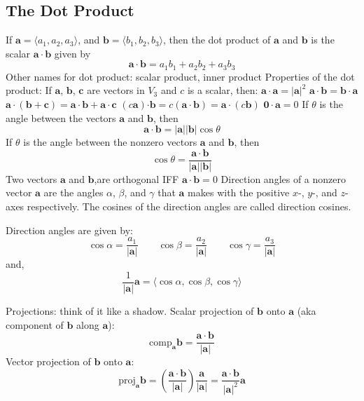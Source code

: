 \documentclass{article}
\begin{document}
    \subsection{The Dot Product}
    \begin{outline}
        \1 If \(\mathbf a=\langle a_1,a_2,a_3\rangle\), and \(\mathbf b=\langle b_1,b_2,b_3\rangle\), then the dot product of \(\mathbf a\) and \(\mathbf b\) is the scalar \(\mathbf{a\cdot b}\) given by \[\mathbf{a\cdot b}=a_1b_1+a_2b_2+a_3b_3\]
        \1 Other names for dot product: scalar product, inner product
        \1 Properties of the dot product: If \(\mathbf a\), \(\mathbf b\), \(\mathbf c\) are vectors in \(V_3\) and $c$ is a scalar, then: 
            \2 \(\mathbf{a\cdot a}=|\mathbf a|^2\)
            \2 \(\mathbf{a\cdot b}=\mathbf{b\cdot a}\)
            \2 \(\mathbf{a\cdot}(\mathbf{b+c})=\mathbf{a\cdot b+a\cdot c}\)
            \2 \((c\mathbf a)\mathbf{\cdot b}=c(\mathbf{a\cdot b})=\mathbf{a\cdot}(c\mathbf b)\)
            \2 \(\mathbf{0\cdot a}=0\)
        \1 If \(\theta\) is the angle between the vectors \(\mathbf a\) and \(\mathbf b\), then \[\mathbf{a\cdot b}=|\mathbf a||\mathbf b|\cos\theta\]
        \1 If \(\theta\) is the angle between the nonzero vectors \(\mathbf a\) and \(\mathbf b\), then \[\cos\theta=\dfrac{\mathbf{a\cdot b}}{|\mathbf a||\mathbf b|}\]
        \1 Two vectors \(\mathbf a\) and \(\mathbf b\),are orthogonal IFF \(\mathbf{a\cdot b}=0\)
        \1 Direction angles of a nonzero vector \(\mathbf a\) are the angles \(\alpha\), \(\beta\), and \(\gamma\) that \(\mathbf a\) makes with the positive \(x\)-, \(y\)-, and \(z\)-axes respectively. The cosines of the direction angles are called direction cosines. 
    \end{outline}
    \begin{outline}
        \1 Direction angles are given by: \[\cos\alpha=\dfrac{a_1}{|\mathbf a|}\qquad\cos\beta=\dfrac{a_2}{|\mathbf a|}\qquad\cos\gamma=\dfrac{a_3}{|\mathbf a|}\] and, \[\dfrac{1}{|\mathbf a|}\mathbf a=\langle\cos\alpha,\cos\beta,\cos\gamma\rangle\]
    \end{outline}\begin{outline}
        \1 Projections: think of it like a shadow. 
        \1 Scalar projection of \(\mathbf b\) onto \(\mathbf a\) (aka component of \(\mathbf b\) along \(\mathbf{a}\)): \[\text{comp}_{\mathbf a}\mathbf b=\dfrac{\mathbf{a\cdot b}}{|\mathbf a|}\]
        \1 Vector projection of \(\mathbf b\) onto \(\mathbf a\): \[\text{proj}_{\mathbf a}\mathbf b=\left(\dfrac{\mathbf{a\cdot b}}{|\mathbf a|}\right)\dfrac{\mathbf a}{|\mathbf a|}=\dfrac{\mathbf{a\cdot b}}{|\mathbf a|^2}\mathbf a\]

    \end{outline} 
\end{document}
